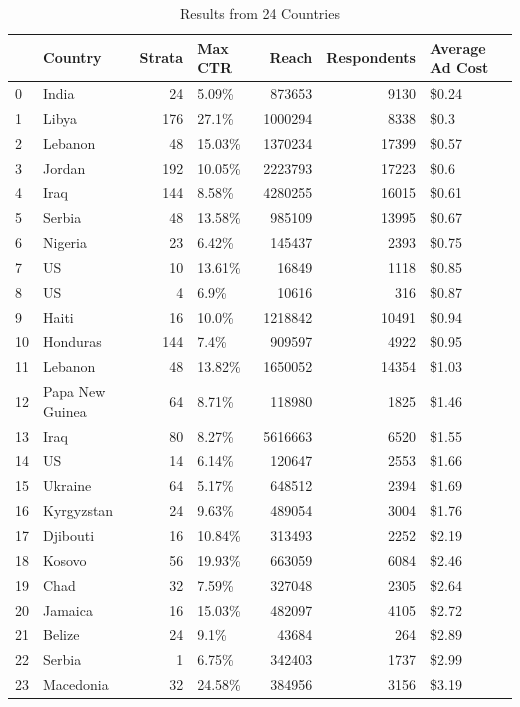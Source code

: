 \documentclass[letterpaper,12pt]{article}
\theoremstyle{proposition}
\begin{document}
\begin{table}[t]
    \centering
    \caption{Results from 24 Countries}
        \label{country-results}
    \vspace*{0.2cm}
\begin{tabular}{llrlrrl}
\toprule
 & Country & Strata & Max CTR & Reach & Respondents & Average Ad Cost \\
\midrule
0 & India & 24 & 5.09\% & 873653 & 9130 & \$0.24 \\
1 & Libya & 176 & 27.1\% & 1000294 & 8338 & \$0.3 \\
2 & Lebanon & 48 & 15.03\% & 1370234 & 17399 & \$0.57 \\
3 & Jordan & 192 & 10.05\% & 2223793 & 17223 & \$0.6 \\
4 & Iraq & 144 & 8.58\% & 4280255 & 16015 & \$0.61 \\
5 & Serbia & 48 & 13.58\% & 985109 & 13995 & \$0.67 \\
6 & Nigeria & 23 & 6.42\% & 145437 & 2393 & \$0.75 \\
7 & US & 10 & 13.61\% & 16849 & 1118 & \$0.85 \\
8 & US & 4 & 6.9\% & 10616 & 316 & \$0.87 \\
9 & Haiti & 16 & 10.0\% & 1218842 & 10491 & \$0.94 \\
10 & Honduras & 144 & 7.4\% & 909597 & 4922 & \$0.95 \\
11 & Lebanon & 48 & 13.82\% & 1650052 & 14354 & \$1.03 \\
12 & Papa New Guinea & 64 & 8.71\% & 118980 & 1825 & \$1.46 \\
13 & Iraq & 80 & 8.27\% & 5616663 & 6520 & \$1.55 \\
14 & US & 14 & 6.14\% & 120647 & 2553 & \$1.66 \\
15 & Ukraine & 64 & 5.17\% & 648512 & 2394 & \$1.69 \\
16 & Kyrgyzstan & 24 & 9.63\% & 489054 & 3004 & \$1.76 \\
17 & Djibouti & 16 & 10.84\% & 313493 & 2252 & \$2.19 \\
18 & Kosovo & 56 & 19.93\% & 663059 & 6084 & \$2.46 \\
19 & Chad & 32 & 7.59\% & 327048 & 2305 & \$2.64 \\
20 & Jamaica & 16 & 15.03\% & 482097 & 4105 & \$2.72 \\
21 & Belize & 24 & 9.1\% & 43684 & 264 & \$2.89 \\
22 & Serbia & 1 & 6.75\% & 342403 & 1737 & \$2.99 \\
23 & Macedonia & 32 & 24.58\% & 384956 & 3156 & \$3.19 \\

\end{tabular}
\end{table}
\end{document}
